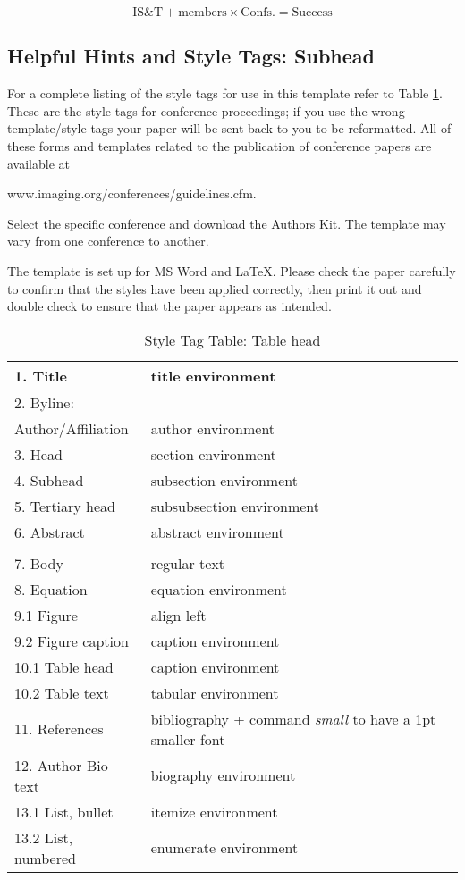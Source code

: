 \documentclass[letterpaper,twocolumn,fleqn]{article}
\begin{document}
\begin{equation}
\label{eq:ist}
\textrm{IS\&T} + \textrm{members} \times \textrm{Confs.} = \textrm{Success}
\end{equation}


\subsection{Helpful Hints and Style Tags: Subhead}
For a complete listing of the style tags for use in this template
refer to Table \ref{tab:fonts}. These are the style tags for
conference proceedings; if you use the wrong template/style tags your
paper will be sent back to you to be reformatted.  All of these forms
and templates related to the publication of conference papers are
available at

www.imaging.org/conferences/guidelines.cfm. 

Select the specific conference and download the Authors Kit. The
template may vary from one conference to another.

The template is set up for MS Word and LaTeX. Please check the paper
carefully to confirm that the styles have been applied correctly, then
print it out and double check to ensure that the paper appears as
intended.

\begin{table}[!h]
\caption{Style Tag Table: Table head}
\label{tab:fonts}
\begin{center}       
\begin{tabular}{|p{}|p{}|} 
\hline
1. Title& title environment \\ \hline
2. Byline: & \\
Author/Affiliation & author environment \\ \hline
3. Head & section environment \\ \hline
4. Subhead & subsection environment \\ \hline
5. Tertiary head & subsubsection environment \\ \hline
6. Abstract & abstract environment \\ \hline 
& \\ \hline
7. Body & regular text\\ \hline
8. Equation & equation environment\\ \hline
9.1 Figure & align left \\ \hline
9.2 Figure caption & caption environment \\ \hline
10.1 Table head & caption environment \\ \hline
10.2 Table text & tabular environment \\ \hline
11. References & bibliography + 
command \emph{small} to have a 1pt smaller font\\ \hline
12. Author Bio text & biography environment\\ \hline
13.1 List, bullet & itemize environment\\ \hline
13.2 List, numbered & enumerate environment \\ \hline
\end{tabular}
\end{center}
\end{table} 
\end{document}
